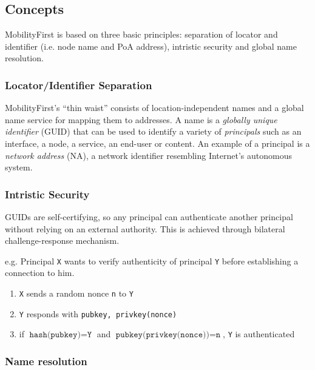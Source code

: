         \subsection{Concepts}

            MobilityFirst is based on three basic principles: separation of locator and identifier (i.e. node name and PoA address), intristic security and global name resolution.

            \subsubsection{Locator/Identifier Separation}

                MobilityFirst's ``thin waist'' consists of location-independent names and a global name service for mapping them to addresses. A name is a \emph{globally unique identifier} (GUID) that can be used to identify a variety of \emph{principals} such as an interface, a node, a service, an end-user or content. An example of a principal is a \emph{network address} (NA), a network identifier resembling Internet's autonomous system.

            \subsubsection{Intristic Security}

                GUIDs are self-certifying, so any principal can authenticate another principal without relying on an external authority. This is achieved through bilateral challenge-response mechanism.

                e.g. Principal \texttt{X} wants to verify authenticity of principal \texttt{Y} before establishing a connection to him.
                \begin{enumerate}
                    \item \texttt{X} sends a random nonce \texttt{n} to \texttt{Y}
                    \item \texttt{Y} responds with \texttt{{pubkey, privkey(nonce)}}
                    \item if $\texttt{hash(pubkey)} = \texttt{Y}$ and $\texttt{pubkey(privkey(nonce))} = \texttt{n}$, \texttt{Y} is authenticated
                \end{enumerate}

            \subsubsection{Name resolution}

